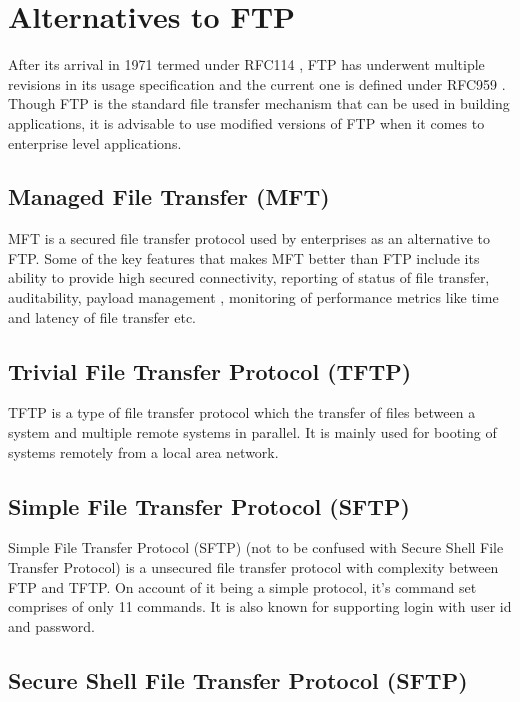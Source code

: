\documentclass[9pt,twocolumn,twoside]{styles/osajnl}
\begin{document}
\section{Alternatives to FTP}

After its arrival in 1971 termed under RFC114 \cite{www-rfc114}, FTP has underwent multiple revisions in its usage specification and the current one is defined under RFC959 \cite{www-rfc959}. Though FTP is the standard file transfer mechanism that can be used in building applications, it is advisable to use modified versions of FTP when it comes to enterprise level applications.

\subsection{Managed File Transfer (MFT)}

MFT \cite{www-wiki-mft} is a secured file transfer protocol used by enterprises as an alternative to FTP. Some of the key features that makes MFT better than FTP include its ability to provide high secured connectivity, reporting of status of file transfer, auditability, payload management , monitoring of performance metrics \cite{www-wiki-perf} like time and latency of file transfer etc. 


\subsection{Trivial File Transfer Protocol (TFTP)}

TFTP \cite{www-wiki-tftp} is a type of file transfer protocol which the transfer of files between a system and multiple remote systems in parallel. It is mainly used for booting of systems remotely from a local area network.

\subsection{Simple File Transfer Protocol (SFTP)}

Simple File Transfer Protocol (SFTP) \cite{www-wiki-ftp} (not to be confused with Secure Shell File Transfer Protocol) is a unsecured file transfer protocol with complexity between FTP and TFTP. On account of it being a simple protocol, it's command set comprises of only 11 commands. It is also known for supporting login with user id and password.

\subsection{Secure Shell File Transfer Protocol (SFTP)}
\end{document}
